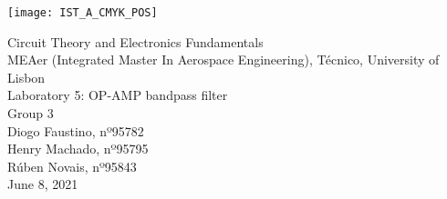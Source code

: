 
\thispagestyle {empty}

\texttt{[image: IST\_A\_CMYK\_POS]}

\begin{center}
%
\vspace{1.0cm}

\vspace{1cm}
{\FontLb Circuit Theory and Electronics Fundamentals} \\ %
\vspace{1cm}
{\FontSn MEAer (Integrated Master In Aerospace Engineering), Técnico, University of Lisbon} \\ %
\vspace{1cm}
{\FontSn Laboratory 5: OP-AMP bandpass filter} \\
\vspace{1cm}
{\FontSn Group 3} \\
\vspace{0.7cm}
{\FontSn Diogo Faustino, nº95782} \\
\vspace{0.4mm}
{\FontSn Henry Machado, nº95795} \\
\vspace{0.4mm}
{\FontSn Rúben Novais, nº95843} \\
\vspace{1cm}
{\FontSn June 8, 2021} \\ %
%
\end{center}

